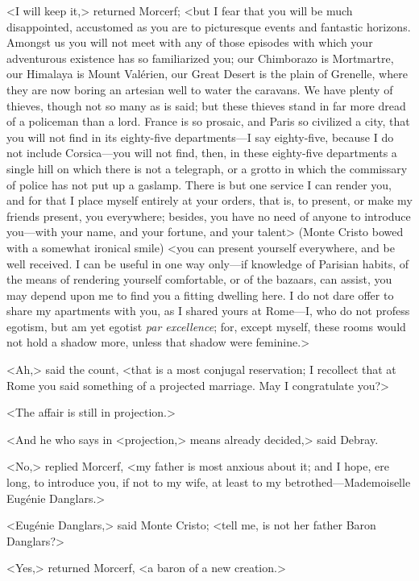  <I will keep it,> returned Morcerf; <but I fear that you will be much disappointed, accustomed as you are to picturesque events and fantastic horizons. Amongst us you will not meet with any of those episodes with which your adventurous existence has so familiarized you; our Chimborazo is Mortmartre, our Himalaya is Mount Valérien, our Great Desert is the plain of Grenelle, where they are now boring an artesian well to water the caravans. We have plenty of thieves, though not so many as is said; but these thieves stand in far more dread of a policeman than a lord. France is so prosaic, and Paris so civilized a city, that you will not find in its eighty-five departments—I say eighty-five, because I do not include Corsica—you will not find, then, in these eighty-five departments a single hill on which there is not a telegraph, or a grotto in which the commissary of police has not put up a gaslamp. There is but one service I can render you, and for that I place myself entirely at your orders, that is, to present, or make my friends present, you everywhere; besides, you have no need of anyone to introduce you—with your name, and your fortune, and your talent> (Monte Cristo bowed with a somewhat ironical smile) <you can present yourself everywhere, and be well received. I can be useful in one way only—if knowledge of Parisian habits, of the means of rendering yourself comfortable, or of the bazaars, can assist, you may depend upon me to find you a fitting dwelling here. I do not dare offer to share my apartments with you, as I shared yours at Rome—I, who do not profess egotism, but am yet egotist \textit{par excellence}; for, except myself, these rooms would not hold a shadow more, unless that shadow were feminine.> 

 <Ah,> said the count, <that is a most conjugal reservation; I recollect that at Rome you said something of a projected marriage. May I congratulate you?> 

 <The affair is still in projection.> 

 <And he who says in <projection,> means already decided,> said Debray. 

 <No,> replied Morcerf, <my father is most anxious about it; and I hope, ere long, to introduce you, if not to my wife, at least to my betrothed—Mademoiselle Eugénie Danglars.> 

 <Eugénie Danglars,> said Monte Cristo; <tell me, is not her father Baron Danglars?> 

 <Yes,> returned Morcerf, <a baron of a new creation.> 

